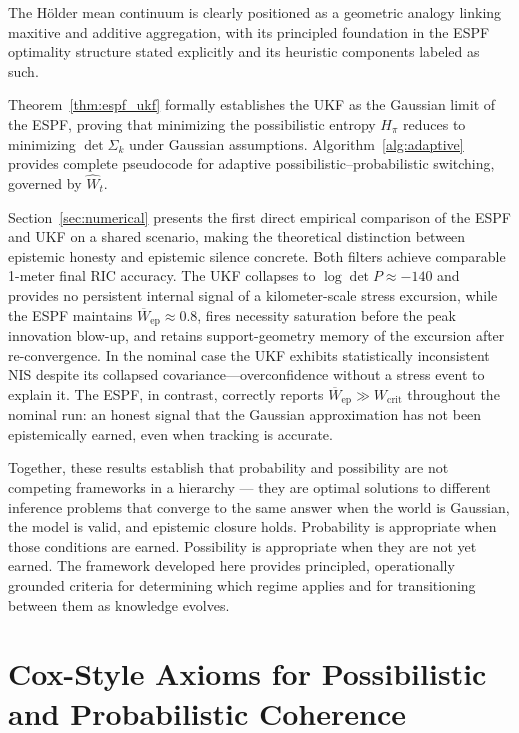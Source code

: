 \documentclass[12pt]{article}
\begin{document}
The H\"older mean continuum is clearly positioned as a geometric analogy
linking maxitive and additive aggregation, with its principled foundation
in the ESPF optimality structure \cite{jah2026optimality} stated explicitly
and its heuristic components labeled as such.

Theorem~\ref{thm:espf_ukf} formally establishes the UKF as the Gaussian
limit of the ESPF, proving that minimizing the possibilistic entropy $H_\pi$
reduces to minimizing $\det\Sigma_k$ under Gaussian assumptions.
Algorithm~\ref{alg:adaptive} provides complete pseudocode for adaptive
possibilistic--probabilistic switching, governed by $\widehat{W}_t$.

Section~\ref{sec:numerical} presents the first direct empirical comparison of
the ESPF and UKF on a shared scenario, making the theoretical distinction
between epistemic honesty and epistemic silence concrete.
Both filters achieve comparable 1-meter final RIC accuracy.
The UKF collapses to $\log\det P\approx -140$ and provides no persistent
internal signal of a kilometer-scale stress excursion, while the ESPF
maintains $\overline{W}_\mathrm{ep}\approx 0.8$, fires necessity saturation
before the peak innovation blow-up, and retains support-geometry memory of
the excursion after re-convergence.
In the nominal case the UKF exhibits statistically inconsistent NIS despite
its collapsed covariance---overconfidence without a stress event to explain it.
The ESPF, in contrast, correctly reports $\overline{W}_\mathrm{ep}\gg W_\mathrm{crit}$
throughout the nominal run: an honest signal that the Gaussian approximation
has not been epistemically earned, even when tracking is accurate.

Together, these results establish that probability and possibility are not competing
frameworks in a hierarchy --- they are optimal solutions to different inference problems
that converge to the same answer when the world is Gaussian, the model is valid, and
epistemic closure holds. Probability is appropriate when those conditions are earned.
Possibility is appropriate when they are not yet earned. The framework developed here
provides principled, operationally grounded criteria for determining which regime applies
and for transitioning between them as knowledge evolves.

\appendix
\section{Cox-Style Axioms for Possibilistic and Probabilistic Coherence}
\label{app:cox}
\end{document}
